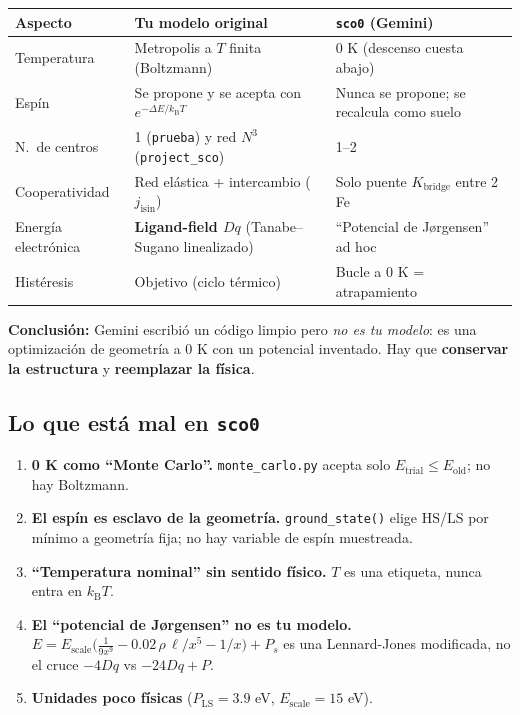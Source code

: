 \documentclass[11pt,a4paper]{article}
\newcommand{\HS}{\mathrm{HS}}
\newcommand{\LS}{\mathrm{LS}}
\newcommand{\Dq}{Dq}
\newcommand{\kb}{k_{\mathrm{B}}}
\begin{document}
\begin{center}
\begin{tabular}{p{4.6cm}p{4.6cm}p{4.6cm}}
\toprule
Aspecto & Tu modelo original & \texttt{sco0} (Gemini) \\
\midrule
Temperatura & Metropolis a $T$ finita (Boltzmann) & 0 K (descenso cuesta abajo) \\
Espín & Se propone y se acepta con $e^{-\Delta E/\kb T}$ & Nunca se propone; se recalcula como suelo \\
N.\ de centros & 1 (\texttt{prueba}) y red $N^3$ (\texttt{project\_sco}) & 1--2 \\
Cooperatividad & Red elástica + intercambio ($j_{\mathrm{isin}}$) & Solo puente $K_{\mathrm{bridge}}$ entre 2 Fe \\
Energía electrónica & \textbf{Ligand-field $\Dq$} (Tanabe--Sugano linealizado) & ``Potencial de Jørgensen'' ad hoc \\
Histéresis & Objetivo (ciclo térmico) & Bucle a 0 K = atrapamiento \\
\bottomrule
\end{tabular}
\end{center}

\textbf{Conclusión:} Gemini escribió un código limpio pero \emph{no es tu
modelo}: es una optimización de geometría a 0 K con un potencial inventado. Hay
que \textbf{conservar la estructura} y \textbf{reemplazar la física}.

\subsection{Lo que está mal en \texttt{sco0}}

\begin{enumerate}
\item \textbf{0 K como ``Monte Carlo''.} \texttt{monte\_carlo.py} acepta solo
  $E_{\mathrm{trial}}\le E_{\mathrm{old}}$; no hay Boltzmann.
\item \textbf{El espín es esclavo de la geometría.} \texttt{ground\_state()} elige
  $\HS$/$\LS$ por mínimo a geometría fija; no hay variable de espín muestreada.
\item \textbf{``Temperatura nominal'' sin sentido físico.} $T$ es una etiqueta,
  nunca entra en $\kb T$.
\item \textbf{El ``potencial de Jørgensen'' no es tu modelo.}
  $E = E_{\mathrm{scale}}\bigl(\tfrac{1}{9x^9} - 0.02\,\rho\,\ell/x^5 - 1/x\bigr)+P_s$
  es una Lennard-Jones modificada, no el cruce $-4\Dq$ vs $-24\Dq+P$.
\item \textbf{Unidades poco físicas} ($P_{\LS}=3.9$ eV, $E_{\mathrm{scale}}=15$ eV).
\end{enumerate}
\end{document}
